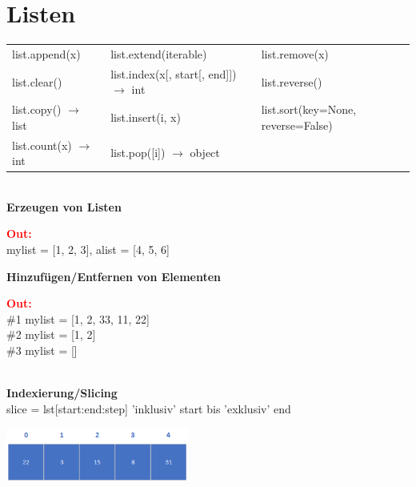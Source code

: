 \section*{Listen}
	\hspace{2cm}
	\begin{tabular}{|l l l|}
		\hline list.append(x) & list.extend(iterable) & list.remove(x)
		\\ list.clear() & list.index(x[, start[, end]]) $\to$ int & list.reverse()
		\\ list.copy() $\to$ list & list.insert(i, x) & list.sort(key=None, reverse=False)
		\\ list.count(x) $\to$ int & list.pop([i]) $\to$ object & 
		\\\hline
	\end{tabular}
	\vspace{0.5cm}
	\\\vspace{0.1cm}
	\textbf{Erzeugen von Listen}
	\\
	\begin{minipage}[h]{10cm}
		
	\end{minipage}
	\begin{minipage}[h]{8cm}
		\textcolor{red}{\textbf{Out:}} \\
		mylist = [1, 2, 3], alist = [4, 5, 6]
	\end{minipage}
	\newpage
	\textbf{Hinzufügen/Entfernen von Elementen}
	\\
	\begin{minipage}[h]{10cm}
		
	\end{minipage}
	\begin{minipage}[h]{8cm}
		\textcolor{red}{\textbf{Out:}}
		\\\#1 mylist = [1, 2, 33, 11, 22]
		\\\#2 mylist = [1, 2]
		\\\#3 mylist = []
	\end{minipage}
	\vspace{0.5cm}
	\\\textbf{Indexierung/Slicing}\\
	slice = lst[start:end:step]
	'inklusiv' start bis 'exklusiv' end\\
	\begin{minipage}[h]{6cm}
		\includegraphics[width=6cm,align=t]{pics/Listen/indexing_pos.png}
	\end{minipage}
